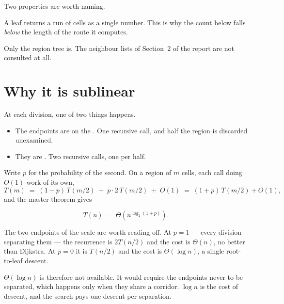 \documentclass[11pt,a4paper]{article}
\begin{document}
Two properties are worth naming.

\begin{description}[leftmargin=*,style=nextline,itemsep=5pt]
  \item[A corridor costs one visit, not its length.] A leaf returns a run of
    cells as a single number. This is why the count below falls \emph{below} the
    length of the route it computes.
  \item[The maze is never read.] Only the region tree is. The neighbour lists of
    Section~2 of the report are not consulted at all.
\end{description}

\section{Why it is sublinear}

At each division, one of two things happens.

\begin{itemize}[leftmargin=*,itemsep=3pt]
  \item The endpoints are on the . One recursive call, and
        half the region is discarded unexamined.
  \item They are . Two recursive calls, one per half.
\end{itemize}

Write $p$ for the probability of the second. On a region of $m$ cells, each call
doing $O(1)$ work of its own,
\[
  T(m) \;=\; (1-p)\,T(m/2) \;+\; p\cdot 2\,T(m/2) \;+\; O(1)
        \;=\; (1+p)\,T(m/2)+O(1),
\]
and the master theorem gives

\begin{keypoint}
\[
  T(n)\;=\;\Theta\!\left(n^{\log_2(1+p)}\right).
\]
\end{keypoint}

The two endpoints of the scale are worth reading off. At $p=1$ --- every
division separating them --- the recurrence is $2T(n/2)$ and the cost is
$\Theta(n)$, no better than Dijkstra. At $p=0$ it is $T(n/2)$ and the cost is
$\Theta(\log n)$, a single root-to-leaf descent.

\begin{keypoint}
$\Theta(\log n)$ is therefore not available. It would require the endpoints
never to be separated, which happens only when they share a corridor.
$\log n$ is the cost of  descent, and the search pays one descent
per separation.
\end{keypoint}
\end{document}
